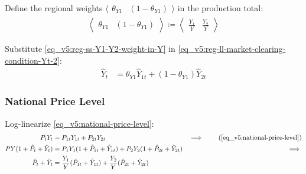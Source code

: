 \documentclass[../thesis.tex]{subfiles}
\begin{document}

Define the regional weights $\langle \begin{smallmatrix} \theta_{Y1} & (1-\theta_{Y1}) \end{smallmatrix} \rangle$ in the production total:
\begin{align}
	\left\langle \begin{matrix} \theta_{Y1} & (1-\theta_{Y1}) \end{matrix} \right\rangle \coloneq \left\langle \begin{matrix} \frac{Y_{1}}{Y} & \frac{Y_{2}}{Y} \end{matrix} \right\rangle \label{eq_v5:reg-ss-Y1-Y2-weight-in-Y}
\end{align}


Substitute \ref{eq_v5:reg-ss-Y1-Y2-weight-in-Y} in \ref{eq_v5:reg-ll-market-clearing-condition-Yt-2}:
\begin{align}
	\hat{Y}_{t} &= \theta_{Y1} \hat{Y}_{1t} + (1-\theta_{Y1}) \hat{Y}_{2t} \label{eq_v5:reg-ll-market-clearing-condition-Yt-3}
\end{align}


\subsubsection*{National Price Level}

Log-linearize \ref{eq_v5:national-price-level}:
\begin{alignat}{2}
	P_{t} Y_{t} &= P_{1t} Y_{1t} + P_{2t} Y_{2t} & \implies \tag{\ref{eq_v5:national-price-level}} \\ 
	P Y (1 + \hat{P}_{t} + \hat{Y}_{t}) &= P_{1} Y_{1} (1 + \hat{P}_{1t} + \hat{Y}_{1t}) + P_{2} Y_{2} (1 + \hat{P}_{2t} + \hat{Y}_{2t}) &\implies \nonumber \\
	\hat{P}_{t} + \hat{Y}_{t} &= \frac{Y_{1}}{Y} (\hat{P}_{1t} + \hat{Y}_{1t}) + \frac{Y_{2}}{Y} (\hat{P}_{2t} + \hat{Y}_{2t}) \label{eq_v5:reg-ll-national-price-level}
\end{alignat}

	
\end{document}
